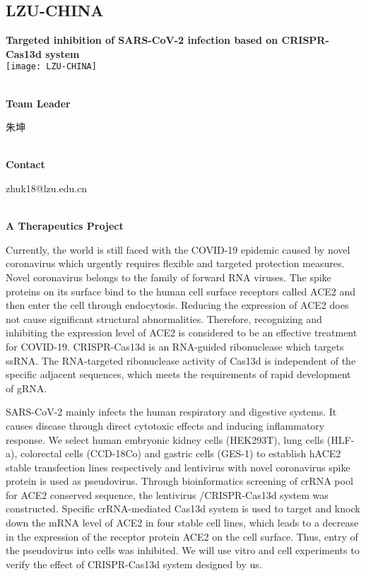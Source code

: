 \subsection{\textcolor{Blu}{ LZU-CHINA } }
\vspace{5mm}
\begin{center}
\large{
  \textbf{ Targeted inhibition of SARS-CoV-2 infection based on CRISPR-Cas13d system }\\

  \texttt{[image: LZU-CHINA]}
}
\end{center}
\textbf{\\Team Leader}

  朱坤


\textbf{\\Contact}

  zhuk18@lzu.edu.cn


\textbf{\\A Therapeutics Project\\}\begin{spacing}{1.5}

Currently, the world is still faced with the COVID-19 epidemic caused by novel coronavirus which urgently requires flexible and targeted protection measures. Novel coronavirus belongs to the family of forward RNA viruses. The spike proteins on its surface bind to the human cell surface receptors called ACE2 and then enter the cell through endocytosis. Reducing the expression of ACE2 does not cause significant structural abnormalities. Therefore, recognizing and inhibiting the expression level of ACE2 is considered to be an effective treatment for COVID-19. CRISPR-Cas13d is an RNA-guided ribonuclease which targets ssRNA. The RNA-targeted ribonuclease activity of Cas13d is independent of the specific adjacent sequences, which meets the requirements of rapid development of gRNA.

SARS-CoV-2 mainly infects the human respiratory and digestive systems. It causes disease through direct cytotoxic effects and inducing inflammatory response. We select human embryonic kidney cells (HEK293T), lung cells (HLF-a), colorectal cells (CCD-18Co) and gastric cells (GES-1) to establish hACE2 stable transfection lines respectively and lentivirus with novel coronavirus spike protein is used as pseudovirus. Through bioinformatics screening of crRNA pool for ACE2 conserved sequence, the lentivirus /CRISPR-Cas13d system was constructed. Specific crRNA-mediated Cas13d system is used to target and knock down the mRNA level of ACE2 in four stable cell lines, which leads to a decrease in the expression of the receptor protein ACE2 on the cell surface. Thus, entry of the pseudovirus into cells was inhibited. We will use vitro and cell experiments to verify the effect of CRISPR-Cas13d system designed by us.\end{spacing}
\\

